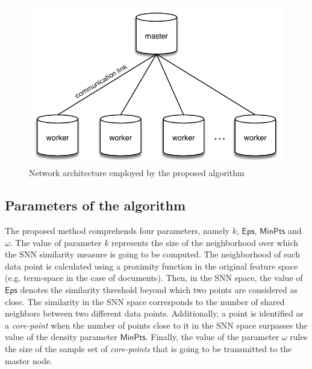 \documentclass[smallextended]{svjour3}       %
\begin{document}
\begin{figure}[!htbp]
\centering
  \includegraphics[scale=0.8]{distributed_architecture.pdf}
  \caption{Network architecture employed by the proposed algorithm}
  \label{fig:distributed_architecture}
\end{figure}

\subsection*{Parameters of the algorithm}
The proposed method comprehends four parameters, namely $k$, $\mathsf{Eps}$, $\mathsf{MinPts}$ and $\omega$. The value of parameter $k$ represents the size of the neighborhood over which the SNN similarity measure is going to be computed. The neighborhood of each data point is calculated using a proximity function in the original feature space (e.g. term-space in the case of documents). Then, in the SNN space, the value of $\mathsf{Eps}$ denotes the similarity threshold beyond which two points are considered as close. The similarity in the SNN space corresponds to the number of shared neighbors between two different data points. Additionally, a point is identified as a \textit{core-point} when the number of points close to it in the SNN space surpasses the value of the density parameter $\mathsf{MinPts}$. Finally, the value of the parameter $\omega$ rules the size of the sample set of \textit{core-points} that is going to be transmitted to the master node.
\end{document}
